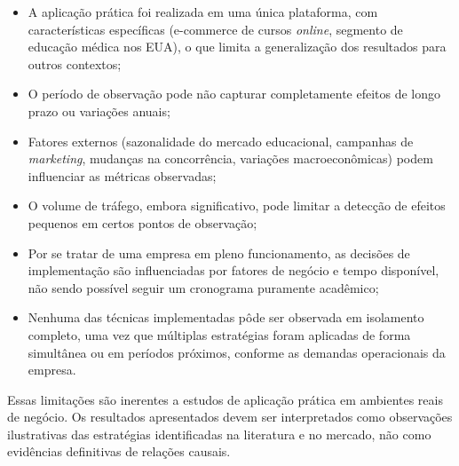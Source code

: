 \begin{itemize}
    \item A aplicação prática foi realizada em uma única plataforma, com características específicas (e-commerce de cursos \textit{online}, segmento de educação médica nos EUA), o que limita a generalização dos resultados para outros contextos;
    \item O período de observação pode não capturar completamente efeitos de longo prazo ou variações anuais;
    \item Fatores externos (sazonalidade do mercado educacional, campanhas de \textit{marketing}, mudanças na concorrência, variações macroeconômicas) podem influenciar as métricas observadas;
    \item O volume de tráfego, embora significativo, pode limitar a detecção de efeitos pequenos em certos pontos de observação;
    \item Por se tratar de uma empresa em pleno funcionamento, as decisões de implementação são influenciadas por fatores de negócio e tempo disponível, não sendo possível seguir um cronograma puramente acadêmico;
    \item Nenhuma das técnicas implementadas pôde ser observada em isolamento completo, uma vez que múltiplas estratégias foram aplicadas de forma simultânea ou em períodos próximos, conforme as demandas operacionais da empresa.
\end{itemize}

Essas limitações são inerentes a estudos de aplicação prática em ambientes reais de negócio. Os resultados apresentados devem ser interpretados como observações ilustrativas das estratégias identificadas na literatura e no mercado, não como evidências definitivas de relações causais.

